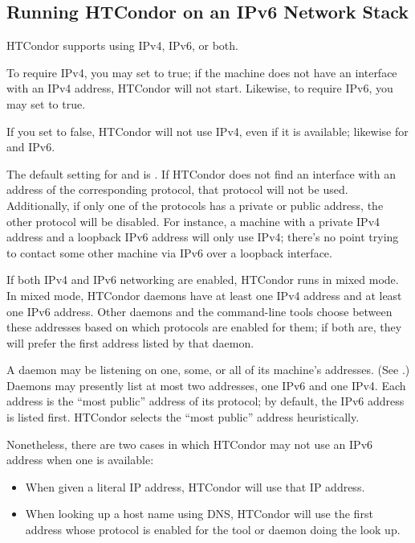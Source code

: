 \subsection{\label{sec:ipv6}Running HTCondor on an IPv6 Network Stack}

HTCondor supports using IPv4, IPv6, or both.

To require IPv4, you may set  to true; if the
machine does not have an interface with an IPv4 address, HTCondor will
not start.  Likewise, to require IPv6, you may set 
to true.

If you set  to false, HTCondor will not use IPv4,
even if it is available; likewise for  and IPv6.

The default setting for  and  is
.  If HTCondor does not find an interface with an address of
the corresponding protocol, that protocol will not be used.  Additionally,
if only one of the protocols has a private or public address, the other
protocol will be disabled.  For instance, a machine with a private IPv4
address and a loopback IPv6 address will only use IPv4; there's no point
trying to contact some other machine via IPv6 over a loopback interface.

If both IPv4 and IPv6 networking are enabled, HTCondor runs in mixed mode.
In mixed mode, HTCondor daemons have at least one IPv4 address and at
least one IPv6 address.  Other daemons and the command-line tools choose
between these addresses based on which protocols are enabled for them; if
both are, they will prefer the first address listed by that daemon.

A daemon may be listening on one, some, or all of its machine's addresses.
(See .)  Daemons may presently list at most two
addresses, one IPv6 and one IPv4.  Each address is the ``most public''
address of its protocol; by default, the IPv6 address is listed first.
HTCondor selects the ``most public'' address heuristically.

Nonetheless, there are two cases in which HTCondor may not use an IPv6
address when one is available:
\begin{itemize}
\item{When given a literal IP address, HTCondor will use that IP address.  }
\item{When looking up a host name using DNS, HTCondor will use the first
address whose protocol is enabled for the tool or daemon doing the look up.  }
\end{itemize}


